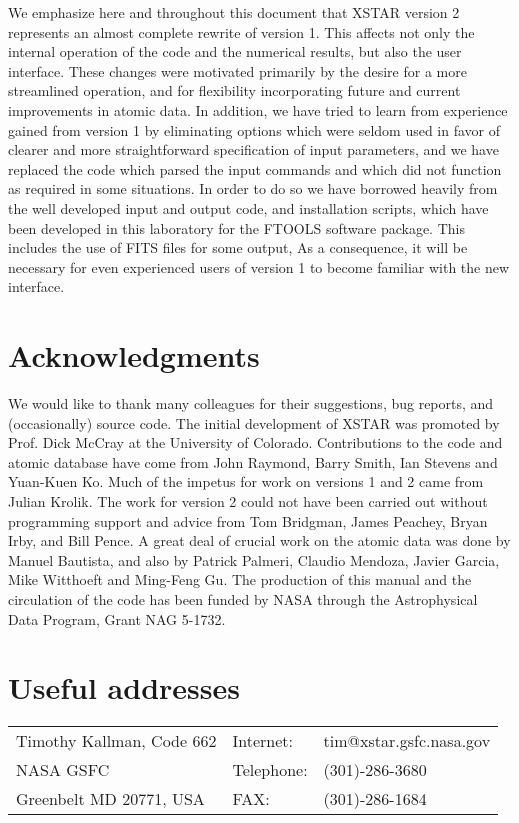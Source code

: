 We emphasize here and throughout this document that XSTAR version 2 represents 
an almost complete rewrite of version 1.  This affects not only the 
internal operation of the code and the numerical results, but also the user interface.
These changes were motivated primarily by the desire for a more streamlined operation, and for 
flexibility incorporating future and current improvements in atomic data.  
In addition, we have tried to learn from experience gained from version 1 by 
eliminating options which were seldom used in favor of clearer and more 
straightforward specification of input parameters, and we have replaced 
the code which parsed the input commands and which did not function as 
required in some situations.  In order to do so we have 
borrowed heavily from the well developed input and output code, and installation 
scripts, which have been developed in this laboratory for the FTOOLS 
software package.  This includes the use of FITS files for some output,
As a consequence, it will be necessary for even experienced users of version 1 to 
become familiar with the new interface.



\section{Acknowledgments}

We would like to thank many colleagues for their suggestions, 
bug reports, and (occasionally)
source code. The initial development of XSTAR was promoted by
Prof. Dick McCray at the University of Colorado.  Contributions to the code
and atomic database have come from John Raymond, Barry Smith, Ian Stevens and 
Yuan-Kuen Ko.  Much of the impetus for work on versions 1 and 2 came from Julian Krolik.
The work for version 2 could not have been carried out without 
programming support and advice  from Tom Bridgman, James Peachey, Bryan Irby, and Bill Pence.
A great deal of crucial work on the atomic data was done by Manuel Bautista, and 
also by Patrick Palmeri, Claudio Mendoza, Javier Garcia, Mike Witthoeft and Ming-Feng Gu.  
The production of this manual and the circulation of the code has been funded 
by NASA through the Astrophysical Data Program, Grant NAG 5-1732.

\section{Useful addresses}
\begin{tabular}{lll}
	Timothy Kallman, Code 662  & Internet: & tim@xstar.gsfc.nasa.gov  \\
	NASA GSFC & Telephone: & (301)-286-3680  \\
	Greenbelt MD 20771, USA  & FAX: &  (301)-286-1684  \\
\end{tabular}

